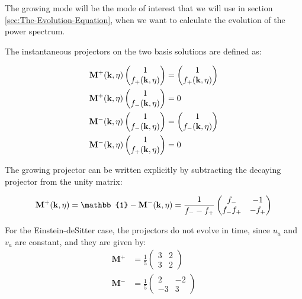 The growing mode will be the mode of interest that we will use in
section \ref{sec:The-Evolution-Equation}, when we want to calculate
the evolution of the power spectrum.

The instantaneous projectors on the two basis solutions are defined
as:

\begin{align*}
\mathrm{\mathbf{M}}{}^{+}(\mathbf{k},\eta)\begin{pmatrix}1\\
f_{+}(\mathbf{k},\eta)
\end{pmatrix} & =\begin{pmatrix}1\\
f_{+}(\mathbf{k},\eta)
\end{pmatrix}\\
\mathrm{\mathbf{M}}{}^{+}(\mathbf{k},\eta)\begin{pmatrix}1\\
f_{-}(\mathbf{k},\eta)
\end{pmatrix} & =0\\
\mathbf{\mathrm{\mathbf{M}}}^{-}(\mathbf{k},\eta)\begin{pmatrix}1\\
f_{-}(\mathbf{k},\eta)
\end{pmatrix} & =\begin{pmatrix}1\\
f_{-}(\mathbf{k},\eta)
\end{pmatrix}\\
\mathrm{\mathbf{M}}^{-}(\mathbf{k},\eta)\begin{pmatrix}1\\
f_{+}(\mathbf{k},\eta)
\end{pmatrix} & =0
\end{align*}


The growing projector can be written explicitly by subtracting the
decaying projector from the unity matrix:

\[
\mathrm{\mathbf{M}}{}^{+}\pkn=\mathbb{1}-\mathrm{\mathbf{M}}{}^{-}\pkn=\frac{1}{f_{-}-f_{+}}\begin{pmatrix}f_{-} & -1\\
f_{-}f_{+} & -f_{+}
\end{pmatrix}
\]


For the Einstein-deSitter case, the projectors do not evolve in time,
since $u_{a}$ and $v_{a}$ are constant, and they are given by: 
\begin{align*}
\mathrm{\mathbf{M}}{}^{+} & =\frac{1}{5}\begin{pmatrix}3 & 2\\
3 & 2
\end{pmatrix}\\
\mathrm{\mathbf{M}}{}^{-} & =\frac{1}{5}\begin{pmatrix}2 & -2\\
-3 & 3
\end{pmatrix}
\end{align*}


